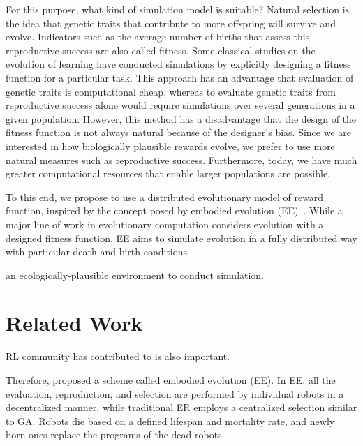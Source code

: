 For this purpose, what kind of simulation model is suitable? Natural selection is the idea that genetic traits that contribute to more offspring will survive and evolve. Indicators such as the average number of births that assess this reproductive success are also called fitness. Some classical studies on the evolution of learning \citep{hintonHowLearningCan1987} have conducted simulations by explicitly designing a fitness function for a particular task. This approach has an advantage that evaluation of genetic traits is computational cheap, whereas to evaluate genetic traits from reproductive success alone would require simulations over several generations in a given population. However, this method has a disadvantage that the design of the fitness function is not always natural because of the designer's bias. Since we are interested in how biologically plausible rewards evolve, we prefer to use more natural measures such as reproductive success. Furthermore, today, we have much greater computational resources that enable larger populations are possible.

To this end, we propose to use a distributed evolutionary model of reward function, inspired by the concept posed by embodied evolution (EE)~\cite{watsonEmbodiedEvolutionDistributing2002}. While a major line of work in evolutionary computation considers evolution with a designed fitness function, EE aims to simulate evolution in a fully distributed way with particular death and birth conditions.

an ecologically-plausible environment to conduct simulation.


\section{Related Work}\label{sec:2}
RL community has contributed to \citet{singhWhereRewardsCome} is also important.

Therefore, \citet{watsonEmbodiedEvolutionDistributing2002} proposed a scheme called embodied evolution (EE). In EE, all the evaluation, reproduction, and selection are performed by individual robots in a decentralized manner, while traditional ER employs a centralized selection similar to GA\@. Robots die based on a defined lifespan and mortality rate, and newly born ones replace the programs of the dead robots.

